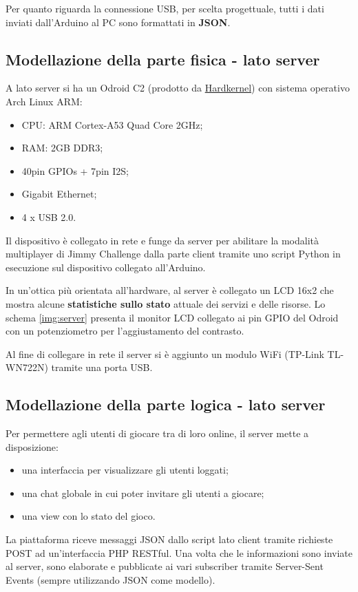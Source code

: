 Per quanto riguarda la connessione USB, per scelta progettuale, tutti i dati inviati dall'Arduino al PC sono formattati in \textbf{JSON}.

\subsection{Modellazione della parte fisica - lato server}
A lato server si ha un Odroid C2 (prodotto da \href{http://www.hardkernel.com/main/main.php}{Hardkernel}) con sistema operativo Arch Linux ARM:
\begin{itemize}
	\item CPU: ARM Cortex-A53 Quad Core 2GHz;
	\item RAM: 2GB DDR3;
	\item 40pin GPIOs + 7pin I2S;
	\item Gigabit Ethernet;
	\item 4 x USB 2.0.
\end{itemize}
Il dispositivo è collegato in rete e funge da server per abilitare la modalità multiplayer di Jimmy Challenge dalla parte client tramite uno script Python in esecuzione sul dispositivo collegato all'Arduino.

In un'ottica più orientata all'hardware, al server è collegato un LCD 16x2 che mostra alcune \textbf{statistiche sullo stato} attuale dei servizi e delle risorse. Lo schema \ref{img:server} presenta il monitor LCD collegato ai pin GPIO del Odroid con un potenziometro per l'aggiustamento del contrasto.

Al fine di collegare in rete il server si è aggiunto un modulo WiFi (TP-Link TL-WN722N) tramite una porta USB.

\subsection{Modellazione della parte logica - lato server}
Per permettere agli utenti di giocare tra di loro online, il server mette a disposizione:
\begin{itemize}
	\item una interfaccia per visualizzare gli utenti loggati;
	\item una chat globale in cui poter invitare gli utenti a giocare;
	\item una view con lo stato del gioco.
\end{itemize}
La piattaforma riceve messaggi JSON dallo script lato client tramite richieste POST ad un'interfaccia PHP RESTful. Una volta che le informazioni sono inviate al server, sono elaborate e pubblicate ai vari subscriber tramite Server-Sent Events (sempre utilizzando JSON come modello).

